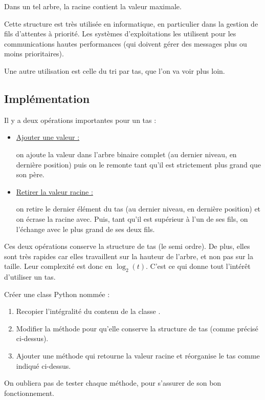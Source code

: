 \documentclass[11pt,a4paper,french,twoside]{PMCours}
\begin{document}
\begin{Remarque}{}
    Dans un tel arbre, la racine contient la valeur maximale.
\end{Remarque}

\begin{Remarque}{}
    Cette structure est très utilisée en informatique, en particulier 
    dans la gestion de fils d'attentes à priorité. Les systèmes d'exploitations
    les utilisent pour les communications hautes performances 
    (qui doivent gérer des messages plus ou moins prioritaires).

    Une autre utilisation est celle du tri par tas, que l'on va voir plus loin.
\end{Remarque}


\subsection{Implémentation}

Il y a deux opérations importantes pour un tas :
\begin{itemize}
    \item \uline{Ajouter une valeur :}
    
    on ajoute la valeur dans l'arbre binaire complet
    (au dernier niveau, en dernière position) puis on le remonte tant qu'il est
    strictement plus grand que son père.
    \item \uline{Retirer la valeur racine :}
    
    on retire le dernier élément du tas
    (au dernier niveau, en dernière position) et on écrase la racine avec.
    Puis, tant qu'il est supérieur à l'un de ses fils, on l'échange avec le plus
    grand de ses deux fils.
\end{itemize}
Ces deux opérations conserve la structure de tas (le semi ordre). De plus, 
elles sont très rapides car elles travaillent sur la hauteur de l'arbre, et non 
pas sur la taille. Leur complexité est donc en $\log_2(t)$. C'est ce qui donne 
tout l'intérêt d'utiliser un tas.

\begin{Exercice}{}
Créer une class Python nommée  :
\begin{enumerate}
    \item Recopier l'intégralité du contenu de la classe .
    \item Modifier la méthode  pour qu'elle conserve
    la structure de tas (comme précisé ci-dessus).
    \item Ajouter une méthode  qui retourne la valeur racine
    et réorganise le tas comme indiqué ci-dessus.       
\end{enumerate}
On oubliera pas de tester chaque méthode, pour s'assurer de son bon fonctionnement.
\end{Exercice}
\end{document}

